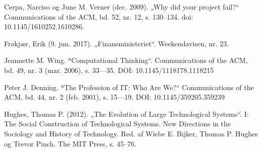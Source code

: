 \documentclass[11pt]{article}
\begin{document}
\begin{thebibliography}{9}
Cerpa, Narciso og June M. Verner (dec. 2009). „Why did your project fail?“ Communications of the ACM, bd. 52, nr. 12, s. 130–134. doi: 10.1145/1610252.1610286.

Frøkjær, Erik (9. jun. 2017). „Finansministeriet“. Weekendavisen, nr. 23.

 Jeannette M. Wing. ªComputational Thinking“. Communications of the ACM, bd. 49, nr. 3
(mar. 2006), s. 33—35. DOI: 10.1145/1118178.1118215

Peter J. Denning. ªThe Profession of IT: Who Are We?“ Communications of the ACM, bd. 44, nr. 2 (feb. 2001), s. 15—19. DOI: 10.1145/359205.359239

Hughes, Thomas P. (2012). „The Evolution of Large Technological Systems“. I: The Social
Construction of Technological Systems. New Directions in the Sociology and History of
Technology. Red. af Wiebe E. Bijker, Thomas P. Hughes og Trevor Pinch. The MIT
Press, s. 45–76.

\end{thebibliography}
\end{document}
